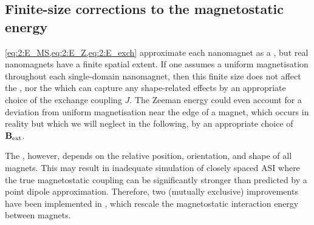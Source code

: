 \subsection{Finite-size corrections to the magnetostatic energy}\label{sec:2:finite}
\cref{eq:2:E_MS,eq:2:E_Z,eq:2:E_exch} approximate each nanomagnet as a , but real nanomagnets have a finite spatial extent.
If one assumes a uniform magnetisation throughout each single-domain nanomagnet, then this finite size does not affect the , nor the  which can capture any shape-related effects by an appropriate choice of the exchange coupling $J$.
The Zeeman energy could even account for a deviation from uniform magnetisation near the edge of a magnet, which occurs in reality but which we will neglect in the following, by an appropriate choice of $\boldsymbol{\mathbf{B}}_\mathrm{ext}$. \par
The , however, depends on the relative position, orientation, and shape of all magnets.
This may result in inadequate simulation of closely spaced ASI where the true magnetostatic coupling can be significantly stronger than predicted by a point dipole approximation.
Therefore, two (mutually exclusive) improvements have been implemented in \hotspice, which rescale the magnetostatic interaction energy between magnets.

